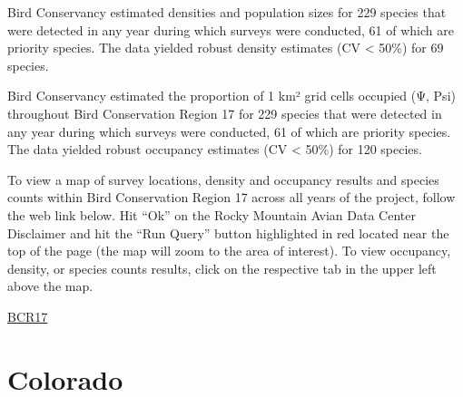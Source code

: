 \documentclass[
  letterpaper,
  DIV=11,
  numbers=noendperiod,
  oneside]{scrreprt}
\begin{document}
Bird Conservancy estimated densities and population sizes for 229
species that were detected in any year during which surveys were
conducted, 61 of which are priority species. The data yielded robust
density estimates (CV \textless{} 50\%) for 69 species.

Bird Conservancy estimated the proportion of 1 km² grid cells occupied
(Ψ, Psi) throughout Bird Conservation Region 17 for 229 species that
were detected in any year during which surveys were conducted, 61 of
which are priority species. The data yielded robust occupancy estimates
(CV \textless{} 50\%) for 120 species.

To view a map of survey locations, density and occupancy results and
species counts within Bird Conservation Region 17 across all years of
the project, follow the web link below. Hit ``Ok'' on the Rocky Mountain
Avian Data Center Disclaimer and hit the ``Run Query'' button
highlighted in red located near the top of the page (the map will zoom
to the area of interest). To view occupancy, density, or species counts
results, click on the respective tab in the upper left above the map.

\href{http://www.rmbo.org/new_site/adc/QueryWindow.aspx\#N4IgzgrgDgpgTmALnAhoiBbEAuABCAIQGEAlARgHYQBfIA==}{BCR17}

\hypertarget{colorado}{%
\chapter{Colorado}\label{colorado}}
\end{document}
